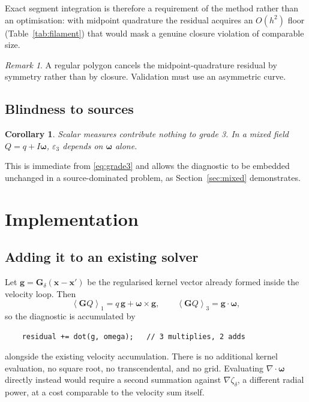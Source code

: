 \documentclass[preprint,12pt,3p]{elsarticle}
\newtheorem{corollary}[theorem]{Corollary}
\theoremstyle{remark}
\newtheorem{remark}[theorem]{Remark}
\newcommand{\grade}[2]{\left\langle #1 \right\rangle_{#2}}
\newcommand{\eps}{\varepsilon_3}
\newcommand{\bx}{\mathbf{x}}
\newcommand{\bG}{\mathbf{G}}
\newcommand{\bomega}{\boldsymbol{\omega}}
\begin{document}
Exact segment integration is therefore a requirement of the method rather than
an optimisation: with midpoint quadrature the residual acquires an $O(h^2)$
floor (Table~\ref{tab:filament}) that would mask a genuine closure violation of
comparable size.

\begin{remark}
A regular polygon cancels the midpoint-quadrature residual by symmetry rather
than by closure. Validation must use an asymmetric curve.
\end{remark}

\subsection{Blindness to sources}

\begin{corollary}
\label{cor:blind}
Scalar measures contribute nothing to grade 3. In a mixed field
$Q = q + I\bomega$, $\eps$ depends on $\bomega$ alone.
\end{corollary}

This is immediate from \eqref{eq:grade3} and allows the diagnostic to be
embedded unchanged in a source-dominated problem, as Section~\ref{sec:mixed}
demonstrates.

\section{Implementation}
\label{sec:implementation}

\subsection{Adding it to an existing solver}

Let $\mathbf{g} = \bG_\delta(\bx-\bx')$ be the regularised kernel vector already
formed inside the velocity loop. Then
\begin{equation}
  \grade{\bG Q}{1} = q\,\mathbf{g} + \bomega\times\mathbf{g},
  \qquad
  \grade{\bG Q}{3} = \mathbf{g}\cdot\bomega ,
\end{equation}
so the diagnostic is accumulated by
\begin{verbatim}
    residual += dot(g, omega);   // 3 multiplies, 2 adds
\end{verbatim}
alongside the existing velocity accumulation. There is no additional kernel
evaluation, no square root, no transcendental, and no grid. Evaluating
$\nabla\cdot\bomega$ directly instead would require a second summation against
$\nabla\zeta_\delta$, a different radial power, at a cost comparable to the
velocity sum itself.
\end{document}
